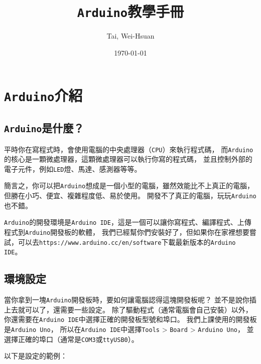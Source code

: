 \documentclass[12pt,a4paper]{article}
\title{\texttt{Arduino}教學手冊}
\author{Tai, Wei-Hsuan}
\date{\today}
\begin{document}
\maketitle

\newpage
\tableofcontents
\newpage

\newpage
\section{\texttt{Arduino}介紹}

\subsection{\texttt{Arduino}是什麼？}
平時你在寫程式時，會使用電腦的中央處理器（\texttt{CPU}）來執行程式碼，
而\texttt{Arduino}的核心是一顆微處理器，這顆微處理器可以執行你寫的程式碼，
並且控制外部的電子元件，例如\texttt{LED}燈、馬達、感測器等等。

簡言之，你可以把\texttt{Arduino}想成是一個小型的電腦，雖然效能比不上真正的電腦，但勝在小巧、便宜、複雜程度低、易於使用。
開發不了真正的電腦，玩玩\texttt{Arduino}也不錯。

\texttt{Arduino}的開發環境是\texttt{Arduino IDE}，這是一個可以讓你寫程式、編譯程式、上傳程式到\texttt{Arduino}開發板的軟體，
我們已經幫你們安裝好了，但如果你在家裡想要嘗試，可以去\texttt{https://www.arduino.cc/en/software}下載最新版本的\texttt{Arduino IDE}。

\subsection{環境設定}

當你拿到一塊\texttt{Arduino}開發板時，要如何讓電腦認得這塊開發板呢？
並不是說你插上去就可以了，還需要一些設定。
除了驅動程式（通常電腦會自己安裝）以外，你還需要在\texttt{Arduino IDE}中選擇正確的開發板型號和埠口。
我們上課使用的開發板是\texttt{Arduino Uno}，
所以在\texttt{Arduino IDE}中選擇\texttt{Tools} > \texttt{Board} > \texttt{Arduino Uno}，
並選擇正確的埠口（通常是\texttt{COM3}或\texttt{ttyUSB0}）。

以下是設定的範例：
\end{document}
